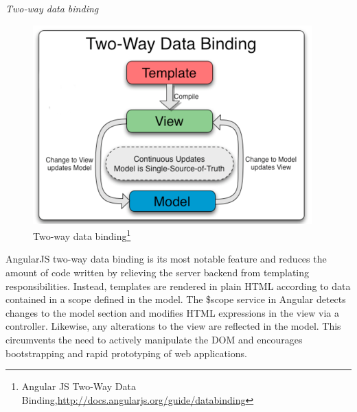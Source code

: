    \emph{Two-way data binding}
   \begin{figure}[!ht]
		\centering
		\includegraphics[scale=0.8]{images/2wayBinding.png}   
		\caption[Two-way data binding]{Two-way data binding\footnote{Angular JS Two-Way Data Binding,\url{http://docs.angularjs.org/guide/databinding}}}                         
		\end{figure}
	AngularJS two-way data binding is its most notable feature and reduces the amount of code written by relieving the server backend from templating responsibilities. Instead, templates are rendered in plain HTML according to data contained in a scope defined in the model. The \$scope service in Angular detects changes to the model section and modifies HTML expressions in the view via a controller. Likewise, any alterations to the view are reflected in the model. This circumvents the need to actively manipulate the DOM and encourages bootstrapping and rapid prototyping of web applications.


